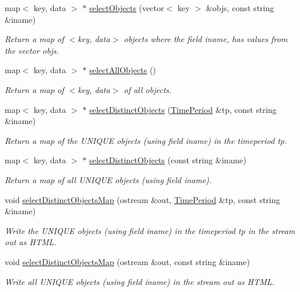 \begin{CompactItemize}
map$<$ key, data $>$ $\ast$ \hyperlink{classSQLTable_SQLTablea12}{select\-Objects} (vector$<$ key $>$ \&objs, const string \&iname)
\begin{CompactList}\small\item\em Return a map of $<$key, data$>$ objects where the field iname, has values from the vector objs.\item\end{CompactList}\item 
map$<$ key, data $>$ $\ast$ \hyperlink{classSQLTable_SQLTablea13}{select\-All\-Objects} ()
\begin{CompactList}\small\item\em Return a map of $<$key, data$>$ of all objects.\item\end{CompactList}\item 
map$<$ key, data $>$ $\ast$ \hyperlink{classSQLTable_SQLTablea14}{select\-Distinct\-Objects} (\hyperlink{classTimePeriod}{Time\-Period} \&tp, const string \&iname)
\begin{CompactList}\small\item\em Return a map of the UNIQUE objects (using field iname) in the timeperiod tp.\item\end{CompactList}\item 
map$<$ key, data $>$ $\ast$ \hyperlink{classSQLTable_SQLTablea15}{select\-Distinct\-Objects} (const string \&iname)
\begin{CompactList}\small\item\em Return a map of all UNIQUE objects (using field iname).\item\end{CompactList}\item 
void \hyperlink{classSQLTable_SQLTablea16}{select\-Distinct\-Objects\-Map} (ostream \&out, \hyperlink{classTimePeriod}{Time\-Period} \&tp, const string \&iname)
\begin{CompactList}\small\item\em Write the UNIQUE objects (using field iname) in the timeperiod tp in the stream out as HTML.\item\end{CompactList}\item 
void \hyperlink{classSQLTable_SQLTablea17}{select\-Distinct\-Objects\-Map} (ostream \&out, const string \&iname)
\begin{CompactList}\small\item\em Write all UNIQUE objects (using field iname) in the stream out as HTML.\item\end{CompactList}\item 

\end{CompactItemize}
